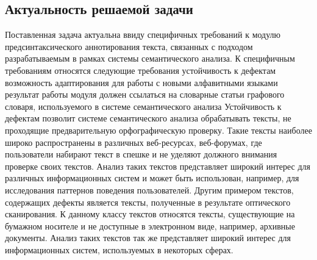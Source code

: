 \subsection{Актуальность решаемой задачи}
Поставленная задача актуальна ввиду специфичных требований к модулю предсинтаксического аннотирования текста, связанных с подходом разрабатываемым в рамках системы семантического анализа. 
К специфичным требованиям относятся следующие требования
устойчивость к дефектам 
возможность адаптирования для работы с новыми алфавитными языками
результат работы модуля должен ссылаться на словарные статьи графового словаря, используемого в системе семантического анализа
Устойчивость к дефектам позволит системе семантического анализа обрабатывать тексты, не проходящие предварительную орфографическую проверку. Такие тексты наиболее широко распространены в различных веб-ресурсах, веб-форумах, где пользователи набирают текст в спешке и не уделяют должного внимания проверке своих текстов. Анализ таких текстов представляет широкий интерес для различных информационных систем и может быть использован, например,  для исследования паттернов поведения пользователей. Другим примером текстов, содержащих дефекты является тексты, полученные в результате оптического сканирования. К данному классу текстов относятся тексты, существующие на бумажном носителе и не доступные в электронном виде, например, архивные документы. Анализ таких текстов так же представляет широкий интерес для информационных систем, используемых в некоторых сферах.